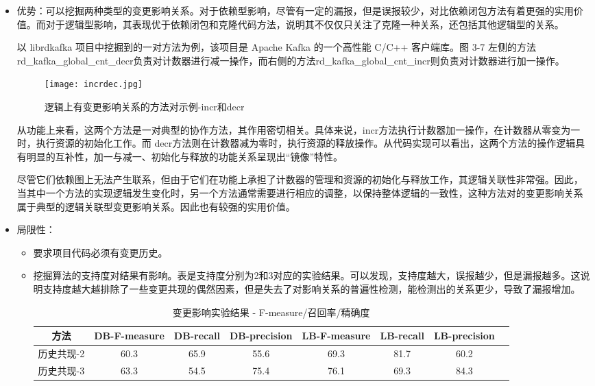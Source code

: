 \begin{itemize}

    \item 优势：可以挖掘两种类型的变更影响关系。对于依赖型影响，尽管有一定的漏报，但是误报较少，对比依赖闭包方法有着更强的实用价值。而对于逻辑型影响，其表现优于依赖闭包和克隆代码方法，说明其不仅仅只关注了克隆一种关系，还包括其他逻辑型的关系。
    
    以 librdkafka 项目中挖掘到的一对方法为例，该项目是 Apache Kafka 的一个高性能 C/C++ 客户端库。图 3-7 左侧的方法rd\_kafka\_global\_cnt\_decr负责对计数器进行减一操作，而右侧的方法rd\_kafka\_global\_cnt\_incr则负责对计数器进行加一操作。

    \begin{figure}[h]
    \centering
    \texttt{[image: incrdec.jpg]}
    \caption{逻辑上有变更影响关系的方法对示例-incr和decr}
    \end{figure}

    从功能上来看，这两个方法是一对典型的协作方法，其作用密切相关。具体来说，incr方法执行计数器加一操作，在计数器从零变为一时，执行资源的初始化工作。而 decr方法则在计数器减为零时，执行资源的释放操作。从代码实现可以看出，这两个方法的操作逻辑具有明显的互补性，加一与减一、初始化与释放的功能关系呈现出“镜像”特性。

    尽管它们依赖图上无法产生联系，但由于它们在功能上承担了计数器的管理和资源的初始化与释放工作，其逻辑关联性非常强。因此，当其中一个方法的实现逻辑发生变化时，另一个方法通常需要进行相应的调整，以保持整体逻辑的一致性，这种方法对的变更影响关系属于典型的逻辑关联型变更影响关系。因此也有较强的实用价值。

    \item 局限性：
    \begin{itemize}
        \item 要求项目代码必须有变更历史。
        \item 挖掘算法的支持度对结果有影响。表是支持度分别为2和3对应的实验结果。可以发现，支持度越大，误报越少，但是漏报越多。这说明支持度越大越排除了一些变更共现的偶然因素，但是失去了对影响关系的普遍性检测，能检测出的关系更少，导致了漏报增加。
        
        \begin{table}[htbp]
            \caption{变更影响实验结果 - F-measure/召回率/精确度}
            \vspace{0.5em}\centering\wuhao
            \begin{tabular}{cccccccc}
            \toprule
            方法 & DB-F-measure & DB-recall & DB-precision & LB-F-measure & LB-recall & LB-precision  \\
            \midrule
            历史共现-2 & 60.3 & 65.9 & 55.6 & 69.3 & 81.7 & 60.2 \\
            历史共现-3 & 63.3 & 54.5 & 75.4 & 76.1 & 69.3 & 84.3 \\
            \bottomrule
            \end{tabular}
            \end{table}


\end{itemize}
\end{itemize}
